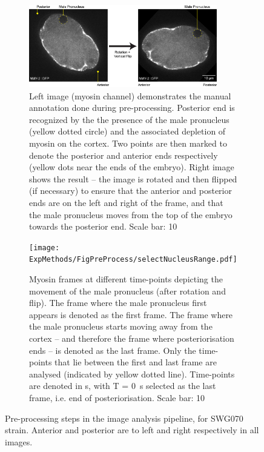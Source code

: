 \begin{figure}[p]
\centering
\begin{subfigure}{\textwidth}
    \centering
    \includegraphics[width=0.9\textwidth]{ExpMethods/FigPreProcess/manualAnnotationRotation.png}   \caption{Left image (myosin channel) demonstrates the manual annotation done during pre-processing. Posterior end is recognized by the the presence of the male pronucleus (yellow dotted circle) and the associated depletion of myosin on the cortex. Two points are then marked to denote the posterior and anterior ends respectively (yellow dots near the ends of the embryo). Right image shows the result -- the image is rotated and then flipped (if necessary) to ensure that the anterior and posterior ends are on the left and right of the frame, and that the male pronucleus moves from the top of the embryo towards the posterior end. Scale bar: \SI{10}{\unitLength}} 
    \label{subfig:preprocess-manual}
\end{subfigure}
\hfill
\begin{subfigure}{\textwidth}
    \centering
    \texttt{[image: ExpMethods/FigPreProcess/selectNucleusRange.pdf]}
    \caption{Myosin frames at different time-points depicting the movement of the male pronucleus (after rotation and flip). The frame where the male pronucleus first appears is denoted as the first frame. The frame where the male pronucleus starts moving away from the cortex -- and therefore the frame where posteriorisation ends -- is denoted as the last frame. Only the time-points that lie between the first and last frame are analysed (indicated by yellow dotted line). Time-points are denoted in \unit{\second}, with T = \SI{0}{\second} selected as the last frame, i.e. end of posteriorisation. Scale bar: \SI{10}{\unitLength}} 
    \label{subfig:preprocess-selectNucleusRange}
\end{subfigure}
\caption[Image analysis: pre-processing]{Pre-processing steps in the image analysis pipeline, for SWG070 strain. Anterior and posterior are to left and right respectively in all images.}
\label{fig:preprocess}
\end{figure}

